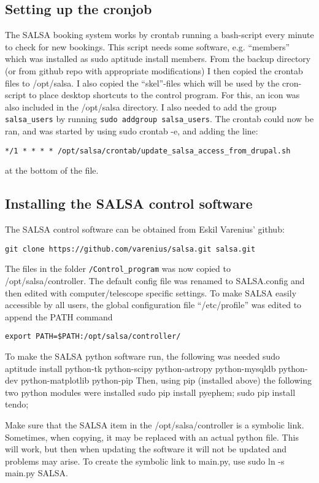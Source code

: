 \subsection{Setting up the cronjob}
The SALSA booking system works by crontab running a bash-script every minute to
check for new bookings. This script needs some software, e.g. “members” which
was installed as sudo aptitude install members. From the backup directory (or
from github repo with appropriate modifications) I then copied the crontab
files to /opt/salsa.  I also copied the “skel”-files which will be used by the
cron-script to place desktop shortcuts to the control program. For this, an
icon was also included in the /opt/salsa directory. I also needed to add the
group \verb!salsa_users! by running \verb!sudo addgroup salsa_users!.  The crontab could
now be ran, and was started by using sudo crontab -e, and adding the line:
\begin{verbatim}
*/1 * * * * /opt/salsa/crontab/update_salsa_access_from_drupal.sh
\end{verbatim}
at the bottom of the file.



\subsection{Installing the SALSA control software}
The SALSA control software can be obtained from Eskil Varenius’ github:
\begin{verbatim}
git clone https://github.com/varenius/salsa.git salsa.git
\end{verbatim}
The files in the folder \verb!/Control_program! was now copied to
/opt/salsa/controller. The default config file was renamed to SALSA.config and
then edited with computer/telescope specific settings. To make SALSA easily
accessible by all users, the global configuration file “/etc/profile” was
edited to append the PATH command 
\begin{verbatim}
export PATH=$PATH:/opt/salsa/controller/
\end{verbatim}

To make the SALSA python software run, the following was needed
sudo aptitude install python-tk python-scipy python-astropy python-mysqldb python-dev python-matplotlib python-pip
Then, using pip (installed above) the following two python modules were installed
sudo pip install pyephem;
sudo pip install tendo;


Make sure that the SALSA item in the /opt/salsa/controller is a symbolic link.
Sometimes, when copying, it may be replaced with an actual python file. This
will work, but then when updating the software it will not be updated and
problems may arise. To create the symbolic link to main.py, use sudo ln -s
main.py SALSA.

